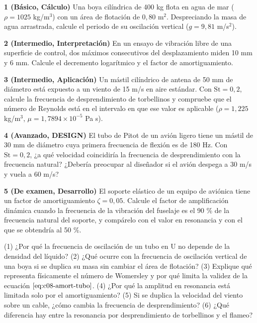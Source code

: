 \documentclass[10pt,openany]{book}
\begin{document}
\begin{tcolorbox}[title={Ejercicios propuestos}, studiumworked, breakable]

\noindent\textbf{1 (Básico, Cálculo)}
Una boya cilíndrica de 400 kg flota en agua de mar (\(\rho = 1025\) kg/m\(^3\)) con un área de flotación de \(0{,}80\) m\(^2\). Despreciando la masa de agua arrastrada, calcule el periodo de su oscilación vertical (\(g = 9{,}81\) m/s\(^2\)).

\noindent\textbf{2 (Intermedio, Interpretación)}
En un ensayo de vibración libre de una superficie de control, dos máximos consecutivos del desplazamiento miden 10 mm y 6 mm. Calcule el decremento logarítmico y el factor de amortiguamiento.

\noindent\textbf{3 (Intermedio, Aplicación)}
Un mástil cilíndrico de antena de 50 mm de diámetro está expuesto a un viento de 15 m/s en aire estándar. Con \(\mathrm{St} = 0{,}2\), calcule la frecuencia de desprendimiento de torbellinos y compruebe que el número de Reynolds está en el intervalo en que ese valor es aplicable (\(\rho = 1{,}225\) kg/m\(^3\), \(\mu = 1{,}7894\times 10^{-5}\) Pa s).

\noindent\textbf{4 (Avanzado, DESIGN)}
El tubo de Pitot de un avión ligero tiene un mástil de 30 mm de diámetro cuya primera frecuencia de flexión es de 180 Hz. Con \(\mathrm{St} = 0{,}2\), ¿a qué velocidad coincidiría la frecuencia de desprendimiento con la frecuencia natural? ¿Debería preocupar al diseñador si el avión despega a 30 m/s y vuela a 60 m/s?

\noindent\textbf{5 (De examen, Desarrollo)}
El soporte elástico de un equipo de aviónica tiene un factor de amortiguamiento \(\zeta = 0{,}05\). Calcule el factor de amplificación dinámica cuando la frecuencia de la vibración del fuselaje es el 90 \% de la frecuencia natural del soporte, y compárelo con el valor en resonancia y con el que se obtendría al 50 \%.
\end{tcolorbox}

\begin{tcolorbox}[title={Autoevaluación}, studiumcheck, breakable]

(1) ¿Por qué la frecuencia de oscilación de un tubo en U no depende de la densidad del líquido? (2) ¿Qué ocurre con la frecuencia de oscilación vertical de una boya si se duplica su masa sin cambiar el área de flotación? (3) Explique qué representa físicamente el número de Womersley y por qué limita la validez de la ecuación \(\eqref{eq:c08-amort-tubo}\). (4) ¿Por qué la amplitud en resonancia está limitada solo por el amortiguamiento? (5) Si se duplica la velocidad del viento sobre un cable, ¿cómo cambia la frecuencia de desprendimiento? (6) ¿Qué diferencia hay entre la resonancia por desprendimiento de torbellinos y el flameo?
\end{tcolorbox}
\studiumchaptercheck
\end{document}
